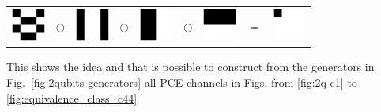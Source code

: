 \documentclass[11pt,dvipsnames]{article} %
\newcommand{\Fref}[1]{Fig.~\ref{#1}}
\newcommand{\1}{\mathds{1}}
\begin{document}
\begin{itemize}
\hfill
\begin{tabular}{m{0.8cm} m{.1cm} m{0.8cm} m{.1cm} m{0.8cm} m{.1cm} m{0.8cm} m{.1cm} m{0.8cm}}
\includegraphics[height=1.1cm]{E12}
& $\bigcirc$ 
& \includegraphics[height=1.1cm]{E4}
& $\bigcirc$ 
& \includegraphics[height=1.1cm]{E2}  
& $\bigcirc$ 
& \includegraphics[height=1.1cm]{E5} 
& $=$
& \includegraphics[height=1.1cm]{E12E4E2E5} 
\end{tabular} \hspace{1.3cm}

This shows the idea and that is possible to construct from the generators
in \Fref{fig:2qubits-generators} 
all PCE channels in Figs. from \ref{fig:2q-c1} to \ref{fig:equivalence_class_c44}


\end{itemize}
\end{document}
